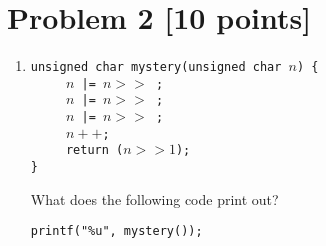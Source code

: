 \newpage
\section{Problem 2 [10 points]}

\begin{enumerate}[label=\alph*.]

\item 
\texttt{unsigned char mystery(unsigned char $n$) \{ }\\
\hspace*{0.5ex}\texttt{$\qquad$   $n$ |= $n >> $ \VARA{};} \\
\hspace*{0.5ex}\texttt{$\qquad$    $n$ |= $n >> $ \VARB{};} \\
\hspace*{0.5ex}\texttt{$\qquad$  $n$ |= $n >>$ \VARC{};} \\
\hspace*{0.5ex}\texttt{$\qquad$   $n++$;} \\
\hspace*{0.5ex}\texttt{$\qquad$ return ($n >> 1$);} \\
\texttt{\}}

What does the following code print out?

\hspace*{0.5ex}\texttt{printf("\%u", mystery(\VARD{})); }
	
		
		


\end{enumerate}